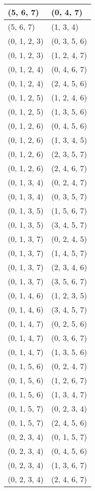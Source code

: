 \begin{footnotesize}
\begin{longtable}[c]{|l|l|}
(5, 6, 7)
&(0, 4, 7)
\\ \hline
(5, 6, 7)
&(1, 3, 4)
\\ \hline
(0, 1, 2, 3)
&(0, 3, 5, 6)
\\ \hline
(0, 1, 2, 3)
&(1, 2, 4, 7)
\\ \hline
(0, 1, 2, 4)
&(0, 4, 6, 7)
\\ \hline
(0, 1, 2, 4)
&(2, 4, 5, 6)
\\ \hline
(0, 1, 2, 5)
&(1, 2, 4, 6)
\\ \hline
(0, 1, 2, 5)
&(1, 3, 5, 6)
\\ \hline
(0, 1, 2, 6)
&(0, 4, 5, 6)
\\ \hline
(0, 1, 2, 6)
&(1, 3, 4, 5)
\\ \hline
(0, 1, 2, 6)
&(2, 3, 5, 7)
\\ \hline
(0, 1, 2, 6)
&(2, 4, 6, 7)
\\ \hline
(0, 1, 3, 4)
&(0, 2, 4, 7)
\\ \hline
(0, 1, 3, 4)
&(0, 3, 5, 7)
\\ \hline
(0, 1, 3, 5)
&(1, 5, 6, 7)
\\ \hline
(0, 1, 3, 5)
&(3, 4, 5, 7)
\\ \hline
(0, 1, 3, 7)
&(0, 2, 4, 5)
\\ \hline
(0, 1, 3, 7)
&(1, 4, 5, 7)
\\ \hline
(0, 1, 3, 7)
&(2, 3, 4, 6)
\\ \hline
(0, 1, 3, 7)
&(3, 5, 6, 7)
\\ \hline
(0, 1, 4, 6)
&(1, 2, 3, 5)
\\ \hline
(0, 1, 4, 6)
&(3, 4, 5, 7)
\\ \hline
(0, 1, 4, 7)
&(0, 2, 5, 6)
\\ \hline
(0, 1, 4, 7)
&(0, 3, 6, 7)
\\ \hline
(0, 1, 4, 7)
&(1, 3, 5, 6)
\\ \hline
(0, 1, 5, 6)
&(0, 2, 4, 7)
\\ \hline
(0, 1, 5, 6)
&(1, 2, 6, 7)
\\ \hline
(0, 1, 5, 6)
&(1, 3, 4, 7)
\\ \hline
(0, 1, 5, 7)
&(0, 2, 3, 4)
\\ \hline
(0, 1, 5, 7)
&(2, 4, 5, 6)
\\ \hline
(0, 2, 3, 4)
&(0, 1, 5, 7)
\\ \hline
(0, 2, 3, 4)
&(0, 4, 5, 6)
\\ \hline
(0, 2, 3, 4)
&(1, 3, 6, 7)
\\ \hline
(0, 2, 3, 4)
&(2, 4, 6, 7)
\\ \hline

\end{longtable}
\end{footnotesize}
